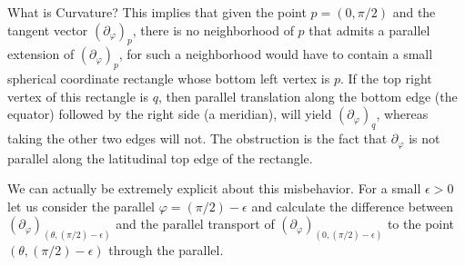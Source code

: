 \documentclass{article}
\numberwithin{equation}{subsection}
\theoremstyle{definition}
\begin{document}
\begin{section}{What is Curvature?}
This implies that given the point $p=(0,\pi/2)$ and the tangent vector $(\partial_{\varphi})_p$, there is no neighborhood of $p$ that admits a parallel extension of $(\partial_{\varphi})_p$, for such a neighborhood would have to contain a small spherical coordinate rectangle whose bottom left vertex is $p$. If the top right vertex of this rectangle is $q$, then parallel translation along the bottom edge (the equator) followed by the right side (a meridian), will yield $(\partial_{\varphi})_q$, whereas taking the other two edges will not. The obstruction is the fact that $\partial_{\varphi}$ is not parallel along the latitudinal top edge of the rectangle.

We can actually be extremely explicit about this misbehavior. For a small $\epsilon>0$ let us consider the parallel $\varphi=(\pi/2)-\epsilon$ and calculate the difference between $(\partial_{\varphi})_{(\theta,(\pi/2)-\epsilon)}$ and the parallel transport of $(\partial_{\varphi})_{(0,(\pi/2)-\epsilon)}$ to the point $(\theta,(\pi/2)-\epsilon)$ through the parallel.


\end{section}
\end{document}
